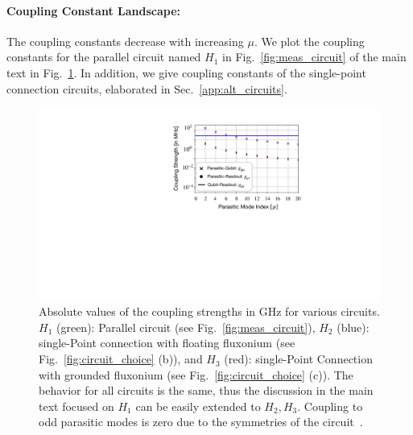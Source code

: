 \documentclass[%
reprint,
superscriptaddress,
 amsmath,amssymb,
 aps,
 prx,
longbibliography,
floatfix,
]{revtex4-2}
\begin{document}
\paragraph{Coupling Constant Landscape:}
The coupling constants decrease with increasing $\mu$. We plot the coupling constants for the parallel circuit named $H_1$ in Fig.~\ref{fig:meas_circuit} of the main text in Fig.~\ref{fig:coupling-strength}. In addition, we give coupling constants of the single-point connection circuits, elaborated in Sec.~\ref{app:alt_circuits}.
\begin{figure}[htb]
    \centering
    \includegraphics[width=\linewidth]{Figures/Coupling_strength.pdf}
    \caption{Absolute values of the coupling strengths in GHz for various circuits. $H_1$ (green): Parallel circuit (see Fig.~\ref{fig:meas_circuit}), $H_2$ (blue): single-Point connection with floating fluxonium  (see Fig.~\ref{fig:circuit_choice} (b)), and $H_3$ (red): single-Point Connection with grounded fluxonium (see Fig.~\ref{fig:circuit_choice} (c)). The behavior for all circuits is the same, thus the discussion in the main text focused on $H_1$ can be easily extended to $H_2,H_3$. Coupling to odd parasitic modes is zero due to the symmetries of the circuit~\cite{viola2015collective}.}
    \label{fig:coupling-strength}
\end{figure}
\end{document}
